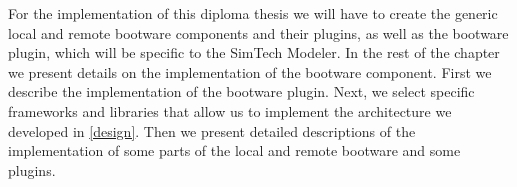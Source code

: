 For the implementation of this diploma thesis we will have to create the generic local and remote bootware components and their plugins, as well as the bootware plugin, which will be specific to the SimTech Modeler.
In the rest of the chapter we present details on the implementation of the bootware component.
First we describe the implementation of the bootware plugin.
Next, we select specific frameworks and libraries that allow us to implement the architecture we developed in \autoref{design}.
Then we present detailed descriptions of the implementation of some parts of the local and remote bootware and some plugins.


